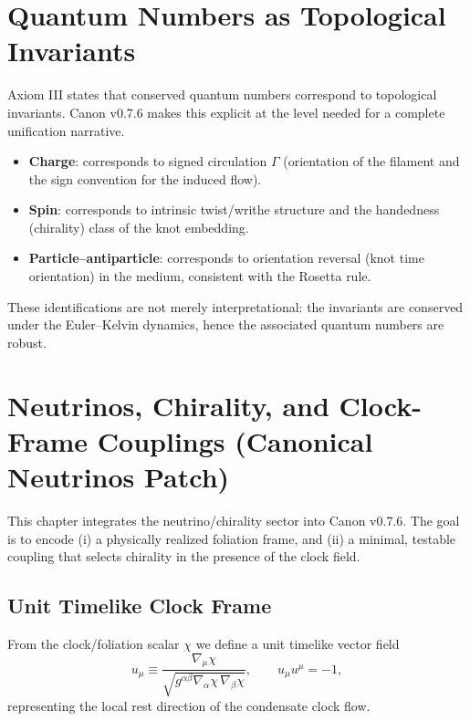 \documentclass[10pt]{article}
\begin{document}
\section{Quantum Numbers as Topological Invariants}
    \label{sec:qn_topology}

    Axiom III states that conserved quantum numbers correspond to topological
    invariants. Canon v0.7.6 makes this explicit at the level needed for a complete
    unification narrative.

    \begin{itemize}
        \item \textbf{Charge}: corresponds to signed circulation $\Gamma$ (orientation
        of the filament and the sign convention for the induced flow).
        \item \textbf{Spin}: corresponds to intrinsic twist/writhe structure and the
        handedness (chirality) class of the knot embedding.
        \item \textbf{Particle--antiparticle}: corresponds to orientation reversal
        (knot time orientation) in the medium, consistent with the Rosetta rule.
    \end{itemize}

    These identifications are not merely interpretational: the invariants are conserved
    under the Euler--Kelvin dynamics, hence the associated quantum numbers are robust.

    \section{Neutrinos, Chirality, and Clock-Frame Couplings (Canonical Neutrinos Patch)}
    \label{sec:neutrinos}

This chapter integrates the neutrino/chirality sector into Canon v0.7.6. The
goal is to encode (i) a physically realized foliation frame, and (ii) a minimal,
testable coupling that selects chirality in the presence of the clock field.

\subsection{Unit Timelike Clock Frame}

From the clock/foliation scalar $\chi$ we define a unit timelike vector field
\begin{equation}
    u_\mu \equiv \frac{\nabla_\mu \chi}{\sqrt{g^{\alpha\beta}\nabla_\alpha\chi\,\nabla_\beta\chi}},
    \qquad
    u_\mu u^\mu = -1,
    \label{eq:unit_u}
\end{equation}
representing the local rest direction of the condensate clock flow.
\end{document}
